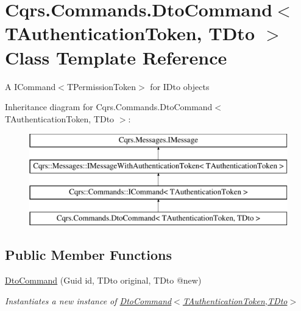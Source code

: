 \hypertarget{classCqrs_1_1Commands_1_1DtoCommand}{}\section{Cqrs.\+Commands.\+Dto\+Command$<$ T\+Authentication\+Token, T\+Dto $>$ Class Template Reference}
\label{classCqrs_1_1Commands_1_1DtoCommand}


A I\+Command$<$\+T\+Permission\+Token$>$ for I\+Dto objects  


Inheritance diagram for Cqrs.\+Commands.\+Dto\+Command$<$ T\+Authentication\+Token, T\+Dto $>$\+:\begin{figure}[H]
\begin{center}
\leavevmode
\includegraphics[height=4.000000cm]{classCqrs_1_1Commands_1_1DtoCommand}
\end{center}
\end{figure}
\subsection*{Public Member Functions}
\begin{DoxyCompactItemize}
\item 
\hyperlink{classCqrs_1_1Commands_1_1DtoCommand_a705b7bdee6a242dd56821c60b4040b23_a705b7bdee6a242dd56821c60b4040b23}{Dto\+Command} (Guid id, T\+Dto original, T\+Dto @new)
\begin{DoxyCompactList}\small\item\em Instantiates a new instance of \hyperlink{classCqrs_1_1Commands_1_1DtoCommand_a705b7bdee6a242dd56821c60b4040b23_a705b7bdee6a242dd56821c60b4040b23}{Dto\+Command$<$\+T\+Authentication\+Token,\+T\+Dto$>$} \end{DoxyCompactList}\end{DoxyCompactItemize}
